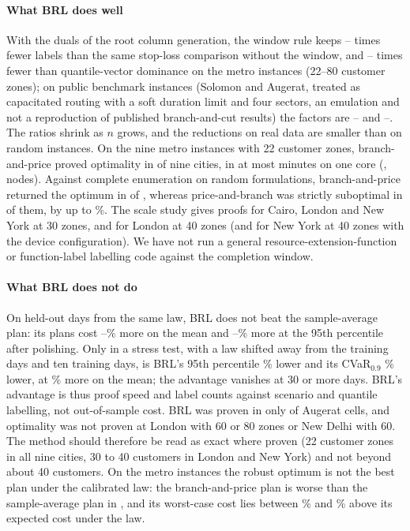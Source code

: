 \documentclass[preprint,11pt]{elsarticle}
\theoremstyle{definition}
\theoremstyle{remark}
\begin{document}
\paragraph{What BRL does well} With the duals of the root column generation, the window rule keeps \BrlLabNowinMetroMin--\BrlLabNowinMetroMax{} times fewer labels than the same stop-loss comparison without the window, and \BrlLabQvMetroMin--\BrlLabQvMetroMax{} times fewer than quantile-vector dominance on the metro instances (22--80 customer zones); on public benchmark instances (Solomon and Augerat, treated as capacitated routing with a soft duration limit and four sectors, an emulation and not a reproduction of published branch-and-cut results) the factors are \BrlLabNowinPubMin--\BrlLabNowinPubMax{} and \BrlLabQvPubMin--\BrlLabQvPubMax. The ratios shrink as $n$ grows, and the reductions on real data are smaller than on random instances. On the nine metro instances with 22 customer zones, branch-and-price proved optimality in \BPoptimalN{} of nine cities, in at most \BPtimeMaxMin{} minutes on one core (\BPtimeMaxCity, \BPnodesMax{} nodes). Against complete enumeration on \BPverN{} random formulations, branch-and-price returned the optimum in \BPverExact{} of \BPverN, whereas price-and-branch was strictly suboptimal in \BPverPBsub{} of them, by up to \BPverPBmax\%. The scale study gives proofs for Cairo, London and New York at 30 zones, and for London at 40 zones (and for New York at 40 zones with the device configuration). We have not run a general resource-extension-function or function-label labelling code \citep{Dabia2013} against the completion window.

\paragraph{What BRL does not do} On held-out days from the same law, BRL does not beat the sample-average plan: its plans cost \BrlOosMeanMin--\BrlOosMeanMax\% more on the mean and \BrlOosPNineFiveMin--\BrlOosPNineFiveMax\% more at the 95th percentile after polishing. Only in a stress test, with a law shifted away from the training days and ten training days, is BRL's 95th percentile \BrlShiftTenPNineFive\% lower and its CVaR$_{0.9}$ \BrlShiftTenCvar\% lower, at \BrlShiftTenMean\% more on the mean; the advantage vanishes at 30 or more days. BRL's advantage is thus proof speed and label counts against scenario and quantile labelling, not out-of-sample cost. BRL was proven in only \BrlAugeratProvenN{} of \BrlAugeratCells{} Augerat cells, and optimality was not proven at London with 60 or 80 zones or New Delhi with 60. The method should therefore be read as exact where proven (22 customer zones in all nine cities, 30 to 40 customers in London and New York) and not beyond about 40 customers. On the metro instances the robust optimum is not the best plan under the calibrated law: the branch-and-price plan is worse than the sample-average plan in \BPtrueWorse, and its worst-case cost lies between \BPconsMin\% and \BPconsMax\% above its expected cost under the law.
\end{document}
